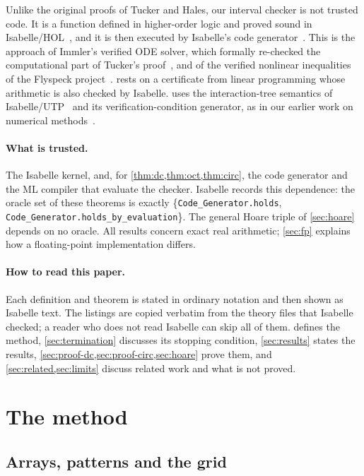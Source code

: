 \documentclass[11pt]{amsart}
\theoremstyle{plain}
\theoremstyle{definition}
\newcommand{\thy}[1]{\texttt{#1}}
\begin{document}
Unlike the original proofs of Tucker and Hales, our interval checker is not trusted code.  It is
a function defined in higher-order logic and proved sound in Isabelle/HOL~\cite{Paulson1990Next700,NipkowPW02},
and it is then executed by Isabelle's code generator~\cite{HaftmannN10}.  This is the approach of
Immler's verified ODE solver, which formally re-checked the computational part of Tucker's
proof~\cite{Immler18}, and of the verified nonlinear inequalities of the Flyspeck
project~\cite{SolovyevH13,Hales2017}.   rests on a certificate from linear
programming whose arithmetic is also checked by Isabelle.   uses the
interaction-tree semantics of Isabelle/UTP~\cite{XiaEtAl2020,FosterHW24,FosterUTP19} and its
verification-condition generator, as in our earlier work on numerical methods~\cite{BryantHF26}.

\paragraph{What is trusted.}  The Isabelle kernel, and, for \cref{thm:dc,thm:oct,thm:circ}, the code
generator and the ML compiler that evaluate the checker.  Isabelle records this dependence: the
oracle set of these theorems is exactly \{\thy{Code\_Generator.holds},
\thy{Code\_Generator.holds\_by\_evaluation}\}.  The general Hoare triple of \cref{sec:hoare} depends
on no oracle.  All results concern exact real arithmetic; \cref{sec:fp} explains how a
floating-point implementation differs.

\paragraph{How to read this paper.}  Each definition and theorem is stated in ordinary notation and
then shown as Isabelle text.  The listings are copied verbatim from the theory files that Isabelle
checked; a reader who does not read Isabelle can skip all of them.
 defines the method, \cref{sec:termination} discusses its stopping condition,
\cref{sec:results} states the results, \cref{sec:proof-dc,sec:proof-circ,sec:hoare} prove them,
and \cref{sec:related,sec:limits} discuss related work and what is not proved.

\section{The method}\label{sec:method}

\subsection{Arrays, patterns and the grid}
\end{document}
